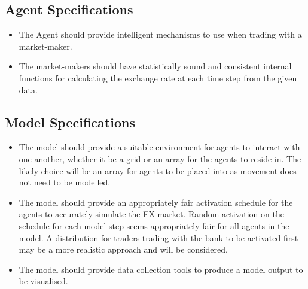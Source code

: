 \subsection{Agent Specifications}
\begin{itemize}
\item The Agent should provide intelligent mechanisms to use when trading with a market-maker.
\item The market-makers should have statistically sound and consistent internal functions for calculating the exchange rate at each time step from the given data.
\end{itemize}

\subsection{Model Specifications}
\begin{itemize}
\item The model should provide a suitable environment for agents to interact with one another, whether it be a grid or an array for the agents to reside in. The likely choice will be an array for agents to be placed into as movement does not need to be modelled.
\item The model should provide an appropriately fair activation schedule for the agents to accurately simulate the FX market. Random activation on the schedule for each model step seems appropriately fair for all agents in the model. A distribution for traders trading with the bank to be activated first may be a more realistic approach and will be considered.
\item The model should provide data collection tools to produce a model output to be visualised.
\end{itemize}
